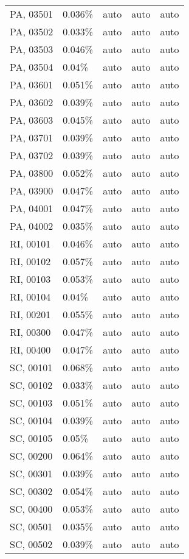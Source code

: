 \begin{longtable}[]{@{}lllll@{}}
PA, 03501 & 0.036\% & auto & auto & auto \\
PA, 03502 & 0.033\% & auto & auto & auto \\
PA, 03503 & 0.046\% & auto & auto & auto \\
PA, 03504 & 0.04\% & auto & auto & auto \\
PA, 03601 & 0.051\% & auto & auto & auto \\
PA, 03602 & 0.039\% & auto & auto & auto \\
PA, 03603 & 0.045\% & auto & auto & auto \\
PA, 03701 & 0.039\% & auto & auto & auto \\
PA, 03702 & 0.039\% & auto & auto & auto \\
PA, 03800 & 0.052\% & auto & auto & auto \\
PA, 03900 & 0.047\% & auto & auto & auto \\
PA, 04001 & 0.047\% & auto & auto & auto \\
PA, 04002 & 0.035\% & auto & auto & auto \\
RI, 00101 & 0.046\% & auto & auto & auto \\
RI, 00102 & 0.057\% & auto & auto & auto \\
RI, 00103 & 0.053\% & auto & auto & auto \\
RI, 00104 & 0.04\% & auto & auto & auto \\
RI, 00201 & 0.055\% & auto & auto & auto \\
RI, 00300 & 0.047\% & auto & auto & auto \\
RI, 00400 & 0.047\% & auto & auto & auto \\
SC, 00101 & 0.068\% & auto & auto & auto \\
SC, 00102 & 0.033\% & auto & auto & auto \\
SC, 00103 & 0.051\% & auto & auto & auto \\
SC, 00104 & 0.039\% & auto & auto & auto \\
SC, 00105 & 0.05\% & auto & auto & auto \\
SC, 00200 & 0.064\% & auto & auto & auto \\
SC, 00301 & 0.039\% & auto & auto & auto \\
SC, 00302 & 0.054\% & auto & auto & auto \\
SC, 00400 & 0.053\% & auto & auto & auto \\
SC, 00501 & 0.035\% & auto & auto & auto \\
SC, 00502 & 0.039\% & auto & auto & auto \\

\end{longtable}
